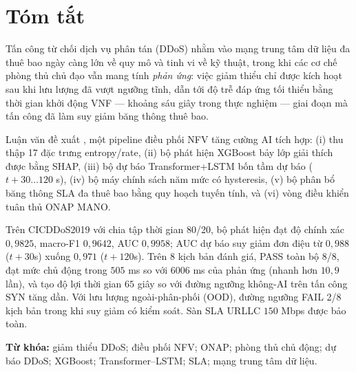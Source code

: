 \clearpage

\chapter*{Tóm tắt}

Tấn công từ chối dịch vụ phân tán (DDoS) nhằm vào mạng trung tâm dữ liệu
đa thuê bao ngày càng lớn về quy mô và tinh vi về kỹ thuật, trong khi
các cơ chế phòng thủ chủ đạo vẫn mang tính \emph{phản ứng}: việc giảm thiểu
chỉ được kích hoạt sau khi lưu lượng đã vượt ngưỡng tĩnh, dẫn tới độ trễ
đáp ứng tối thiểu bằng thời gian khởi động VNF --- khoảng sáu giây trong
thực nghiệm --- giai đoạn mà tấn công đã làm suy giảm băng thông thuê bao.

Luận văn đề xuất \padonap{}, một pipeline điều phối NFV tăng cường AI tích
hợp: (i) thu thập 17 đặc trưng entropy/rate, (ii) bộ phát hiện XGBoost bảy
lớp giải thích được bằng SHAP, (iii) bộ dự báo Transformer+LSTM bốn tầm
dự báo (\(t{+}30{\dots}120\) s), (iv) bộ máy chính sách năm mức có
hysteresis, (v) bộ phân bổ băng thông SLA đa thuê bao bằng quy hoạch tuyến
tính, và (vi) vòng điều khiển tuân thủ ONAP MANO.

Trên CICDDoS2019 với chia tập thời gian 80/20, bộ phát hiện đạt độ chính
xác \(0{,}9825\), macro-F1 \(0{,}9642\), AUC \(0{,}9958\); AUC dự báo suy
giảm đơn điệu từ \(0{,}988\) (\(t{+}30\)s) xuống \(0{,}971\) (\(t{+}120\)s).
Trên 8 kịch bản đánh giá, \padonap{} PASS toàn bộ 8/8, đạt mức
 chủ động trong \(505\) ms so với \(6006\) ms của  phản ứng
(nhanh hơn \(10{,}9\) lần), và tạo độ lợi thời gian \(65\) giây so với
đường ngưỡng không-AI trên tấn công SYN tăng dần. Với lưu lượng
ngoài-phân-phối (OOD), đường ngưỡng FAIL 2/8 kịch bản trong khi \padonap{}
suy giảm có kiểm soát. Sàn SLA URLLC \(150\) Mbps được bảo toàn.

\noindent\textbf{Từ khóa:} giảm thiểu DDoS; điều phối NFV; ONAP; phòng thủ
chủ động; dự báo DDoS; XGBoost; Transformer--LSTM; SLA; mạng trung tâm
dữ liệu.


